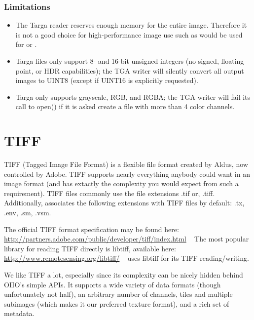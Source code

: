 \subsubsection*{Limitations}

\begin{itemize}
\item The Targa reader reserves enough memory for the entire image.
  Therefore it is not a good choice for high-performance image use such 
  as would be used for \ImageCache or \TextureSystem.
\item Targa files only support 8- and 16-bit unsigned integers (no
  signed, floating point, or HDR capabilities); the \product TGA writer
  will silently convert all output images to UINT8 (except if UINT16 is
  explicitly requested).
\item Targa only supports grayscale, RGB, and RGBA; the \product TGA
  writer will fail its call to {\cf open()} if it is asked create a file
  with more than 4 color channels.
\end{itemize}


\vspace{.25in}

\section{TIFF}
\label{sec:bundledplugins:tiff}

TIFF (Tagged Image File Format) is a flexible file format created by
Aldus, now controlled by Adobe.  TIFF supports nearly everything anybody
could want in an image format (and has extactly the complexity you would
expect from such a requirement).
TIFF files commonly use the file extensions {\cf .tif} or, {\cf .tiff}.
Additionally, \product associates the following extensions with TIFF
files by default: {\cf .tx}, {\cf .env}, {\cf .sm}, {\cf .vsm}.

The official TIFF format specification may be found here:
\url{http://partners.adobe.com/public/developer/tiff/index.html} 
~ The most popular library for reading TIFF directly is {\cf libtiff},
available here: 
\url{http://www.remotesensing.org/libtiff/} ~ \product uses {\cf libtiff}
for its TIFF reading/writing.

We like TIFF a lot, especially since its complexity can be nicely hidden
behind OIIO's simple APIs.  It supports a wide variety of data formats
(though unfortunately not {\cf half}), an arbitrary number of channels,
tiles and multiple subimages (which makes it our preferred texture
format), and a rich set of metadata.

